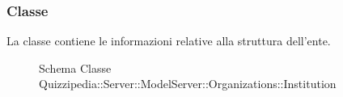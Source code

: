 \subsubsection{Classe }
La classe contiene le informazioni relative alla struttura dell'ente.
\begin{figure}[H]
\centering
\noindent{}
\caption[Schema Classe Institution]{Schema Classe Quizzipedia::Server::ModelServer::Organizations::Institution}
\end{figure}
